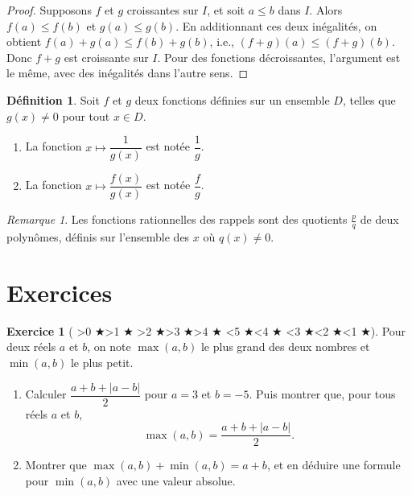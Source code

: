\documentclass[12pt,a4paper]{article}
\newcommand{\diff}[1]{%
  \textcolor{orange!80!black}{\ifnum#1>0 $\bigstar$\fi\ifnum#1>1 $\bigstar$\fi
  \ifnum#1>2 $\bigstar$\fi\ifnum#1>3 $\bigstar$\fi\ifnum#1>4 $\bigstar$\fi}%
  \textcolor{gray!40}{\ifnum#1<5 $\bigstar$\fi\ifnum#1<4 $\bigstar$\fi
  \ifnum#1<3 $\bigstar$\fi\ifnum#1<2 $\bigstar$\fi\ifnum#1<1 $\bigstar$\fi}}
\theoremstyle{plain}
\theoremstyle{definition}
\newtheorem{definition}[theorem]{Définition}
\newtheorem{exercise}{Exercice}
\theoremstyle{remark}
\newtheorem*{remark}{Remarque}
\begin{document}
\begin{proof}
  Supposons $f$ et $g$ croissantes sur $I$, et soit $a \le b$ dans $I$. Alors
  $f(a) \le f(b)$ et $g(a) \le g(b)$. En additionnant ces deux inégalités, on obtient
  $f(a) + g(a) \le f(b) + g(b)$, i.e., $(f + g)(a) \le (f + g)(b)$. Donc $f + g$ est
  croissante sur $I$. Pour des fonctions décroissantes, l'argument est le même, avec
  des inégalités dans l'autre sens.
\end{proof}

\begin{tcolorbox}[navybar]
  \begin{definition}
    Soit $f$ et $g$ deux fonctions définies sur un ensemble $D$, telles que
    $g(x) \neq 0$ pour tout $x \in D$.
    \begin{enumerate}[label=(\roman*)]
      \item\label{def:inverse} La fonction $x \mapsto \dfrac{1}{g(x)}$ est notée
      $\dfrac{1}{g}$.
      \item\label{def:quotient} La fonction $x \mapsto \dfrac{f(x)}{g(x)}$ est notée
      $\dfrac{f}{g}$.
    \end{enumerate}
  \end{definition}
\end{tcolorbox}

\begin{remark}
  Les fonctions rationnelles des rappels sont des quotients $\frac{p}{q}$ de deux
  polynômes, définis sur l'ensemble des $x$ où $q(x) \neq 0$.
\end{remark}

\section{Exercices}

\begin{exercise}[\diff{3}]
Pour deux réels $a$ et $b$, on note $\max(a, b)$ le plus grand des deux nombres
et $\min(a, b)$ le plus petit.
\begin{enumerate}[label=\alph*)]
  \item Calculer $\dfrac{a + b + \lvert a - b \rvert}{2}$ pour $a = 3$ et $b = -5$.
  Puis montrer que, pour tous réels $a$ et $b$,
  \[
    \max(a, b) = \frac{a + b + \lvert a - b \rvert}{2}.
  \]
  \item Montrer que $\max(a, b) + \min(a, b) = a + b$, et en déduire une formule
  pour $\min(a, b)$ avec une valeur absolue.
\end{enumerate}
\label{ex:max_min}
\end{exercise}
\end{document}
